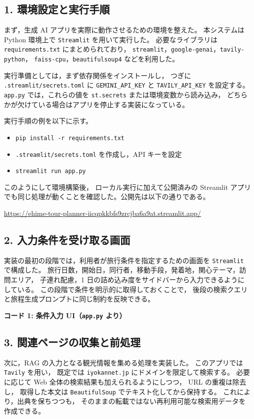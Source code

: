 \documentclass[a4paper,11pt]{ltjsarticle}
\begin{document}
\subsection*{1. 環境設定と実行手順}
まず，生成 AI アプリを実際に動作させるための環境を整えた。
本システムは Python 環境上で \texttt{Streamlit} を用いて実行した。
必要なライブラリは \texttt{requirements.txt} にまとめられており，
\texttt{streamlit}，\texttt{google-genai}，\texttt{tavily-python}，
\texttt{faiss-cpu}，\texttt{beautifulsoup4} などを利用した。

実行準備としては，まず依存関係をインストールし，
つぎに \texttt{.streamlit/secrets.toml} に
\texttt{GEMINI\_API\_KEY} と \texttt{TAVILY\_API\_KEY} を設定する。
\texttt{app.py} では，これらの値を \texttt{st.secrets} または環境変数から読み込み，
どちらかが欠けている場合はアプリを停止する実装になっている。

実行手順の例を以下に示す。
\begin{itemize}
\item \texttt{pip install -r requirements.txt}
\item \texttt{.streamlit/secrets.toml} を作成し，API キーを設定
\item \texttt{streamlit run app.py}
\end{itemize}

このようにして環境構築後，
ローカル実行に加えて公開済みの Streamlit アプリでも同じ処理が動くことを確認した。公開先は以下の通りである。\par
\url{https://ehime-tour-planner-iicqpkkbfs9zrcjba6a9at.streamlit.app/}

\subsection*{2. 入力条件を受け取る画面}
実装の最初の段階では，利用者が旅行条件を指定するための画面を \texttt{Streamlit} で構成した。
旅行日数，開始日，同行者，移動手段，発着地，関心テーマ，訪問エリア，
子連れ配慮，1 日の詰め込み度をサイドバーから入力できるようにしている。
この段階で条件を明示的に取得しておくことで，
後段の検索クエリと旅程生成プロンプトに同じ制約を反映できる。

\noindent\textbf{コード 1: 条件入力 UI（\texttt{app.py} より）}

\subsection*{3. 関連ページの収集と前処理}
次に，RAG の入力となる観光情報を集める処理を実装した。
このアプリでは \texttt{Tavily} を用い，
既定では \texttt{iyokannet.jp} にドメインを限定して検索する。
必要に応じて Web 全体の検索結果も加えられるようにしつつ，
URL の重複は除去し，
取得した本文は \texttt{BeautifulSoup} でテキスト化してから保持する。
これにより，出典を保ちつつも，
そのままの転載ではない再利用可能な検索用データを作成できる。
\end{document}
